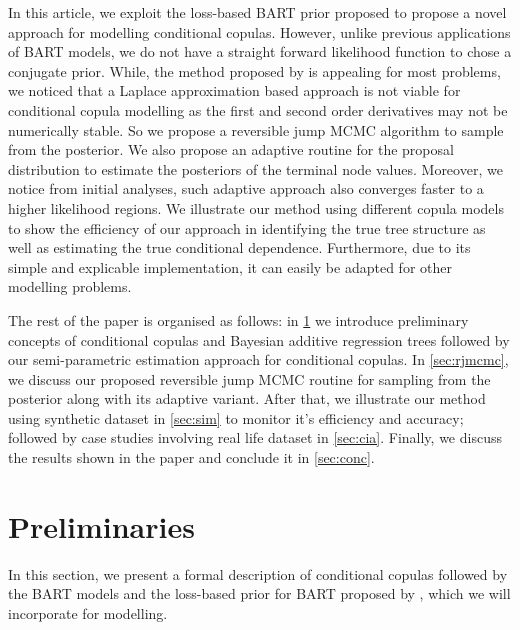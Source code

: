 \documentclass{amsart}
\begin{document}
In this article, we exploit the loss-based BART prior proposed \citet{serafini2024lossbasedpriortreetopologies} to propose a novel approach for modelling conditional copulas. However, unlike previous applications of BART models, we do not have a straight forward likelihood function to chose a conjugate prior. While, the method proposed by \citet{Linero02012025} is appealing for most problems, we noticed that a Laplace approximation based approach is not
viable for conditional copula modelling as the first and second order derivatives may not be numerically stable. So we propose a reversible jump MCMC algorithm to sample from the posterior. We also propose an adaptive routine for the proposal distribution to estimate the posteriors of the terminal node values. Moreover, we notice from initial analyses, such adaptive approach also converges faster to a higher likelihood regions. We illustrate our method using different copula models to show the efficiency of our approach in identifying the true tree structure as well as estimating the true conditional dependence. Furthermore, due to its simple and explicable implementation, it can easily be adapted for other modelling problems. 

The rest of the paper is organised as follows: in \cref{sec:prelim} we introduce preliminary concepts of conditional copulas and Bayesian additive regression trees followed by our semi-parametric estimation approach for conditional copulas. In \cref{sec:rjmcmc}, we discuss our proposed reversible jump MCMC routine for sampling from the posterior along with its adaptive variant. After that, we illustrate our method using synthetic dataset in \cref{sec:sim} to monitor it's efficiency and accuracy; followed by case studies involving real life dataset in \cref{sec:cia}. Finally, we discuss the results shown in the paper and conclude it in \cref{sec:conc}.

\section{Preliminaries}\label{sec:prelim}

In this section, we present a formal description of conditional copulas followed by the BART models and the loss-based prior for BART proposed by \citet{serafini2024lossbasedpriortreetopologies}, which we will incorporate for modelling.
\end{document}
